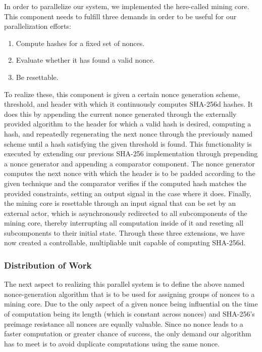 
In order to parallelize our system, we implemented the here-called mining core. This component needs to fulfill three demands in order to be useful for our parallelization efforts:

\begin{enumerate}
	\item Compute hashes for a fixed set of nonces.
	\item Evaluate whether it has found a valid nonce.
	\item Be resettable.
\end{enumerate}

To realize these, this component is given a certain nonce generation scheme, threshold, and header with which it continuously computes SHA-256d hashes. It does this by appending the current nonce generated through the externally provided algorithm to the header for which a valid hash is desired, computing a hash, and repeatedly regenerating the next nonce through the previously named scheme until a hash satisfying the given threshold is found.
This functionality is executed by extending our previous SHA-256 implementation through prepending a nonce generator and appending a comparator component. The nonce generator computes the next nonce with which the header is to be padded according to the given technique and the comparator verifies if the computed hash matches the provided constraints, setting an output signal in the case where it does.
Finally, the mining core is resettable through an input signal that can be set by an external actor, which is asynchronously redirected to all subcomponents of the mining core, thereby interrupting all computation inside of it and reseting all subcomponents to their initial state. Through these three extensions, we have now created a controllable, multipliable unit capable of computing SHA-256d.


\subsubsection{Distribution of Work}

The next aspect to realizing this parallel system is to define the above named nonce-generation algorithm that is to be used for assigning groups of nonces to a mining core. Due to the only aspect of a given nonce being influential on the time of computation being its length (which is constant across nonces) and SHA-256's preimage resistance all nonces are equally valuable. 
Since no nonce leads to a faster computation or greater chance of success, the only demand our algorithm has to meet is to avoid duplicate computations using the same nonce. 

